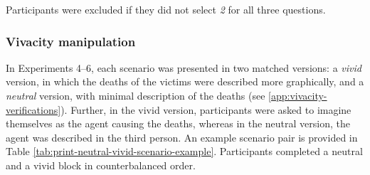 \documentclass[
]{article}
\begin{document}
Participants were excluded if they did not select \emph{2} for all three questions.

\subsubsection{Vivacity manipulation}\label{vivacity-manipulation}

In Experiments 4--6, each scenario was presented in two matched versions: a \emph{vivid} version, in which the deaths of the victims were described more graphically, and a \emph{neutral} version, with minimal description of the deaths (see \ref{app:vivacity-verifications}). Further, in the vivid version, participants were asked to imagine themselves as the agent causing the deaths, whereas in the neutral version, the agent was described in the third person. An example scenario pair is provided in Table \ref{tab:print-neutral-vivid-scenario-example}. Participants completed a neutral and a vivid block in counterbalanced order.
\end{document}
